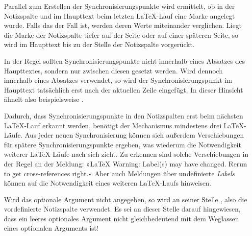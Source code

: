 Parallel zum Erstellen der Synchronisierungspunkte wird ermittelt, ob in
der Notizspalte und im Haupttext beim letzten \LaTeX-Lauf eine Marke angelegt
wurde. Falls das der Fall ist, werden deren Werte miteinander
verglichen. Liegt die Marke der Notizspalte tiefer auf der Seite oder auf
einer späteren Seite, so wird im Haupttext bis zu der Stelle der Notizspalte
vorgerückt.

In der Regel sollten Synchronisierungspunkte nicht
innerhalb eines Absatzes des Haupttextes, sondern nur zwischen diesen gesetzt
werden. Wird  dennoch innerhalb eines Absatzes
verwendet, so wird der Synchronisierungspunkt im Haupttext tatsächlich erst
nach der aktuellen Zeile eingefügt. In dieser Hinsicht ähnelt
 also beispielsweise
.

Dadurch, dass Synchronisierungspunkte in den Notizspalten erst beim nächsten
\LaTeX-Lauf erkannt werden, benötigt der
Mechanismus mindestens drei \LaTeX-Läufe. Aus jeder neuen Synchronisierung
können sich außerdem Verschiebungen für spätere Synchronisierungspunkte
ergeben, was wiederum die Notwendigkeit weiterer \LaTeX-Läufe nach sich
zieht. Zu erkennen sind solche Verschiebungen in der Regel an der Meldung:
»\LaTeX{} Warning: Label(s) may have changed. Rerun to get cross-references
right.« Aber auch Meldungen über undefinierte \emph{Labels} können auf die
Notwendigkeit eines weiteren \LaTeX-Laufs hinweisen.

Wird das optionale Argument nicht angegeben, so wird an seiner Stelle
, also die vordefinierte Notizspalte
verwendet. Es sei an dieser Stelle darauf hingewiesen, dass
ein leeres optionales Argument nicht gleichbedeutend mit dem Weglassen eines
optionalen Arguments ist!

